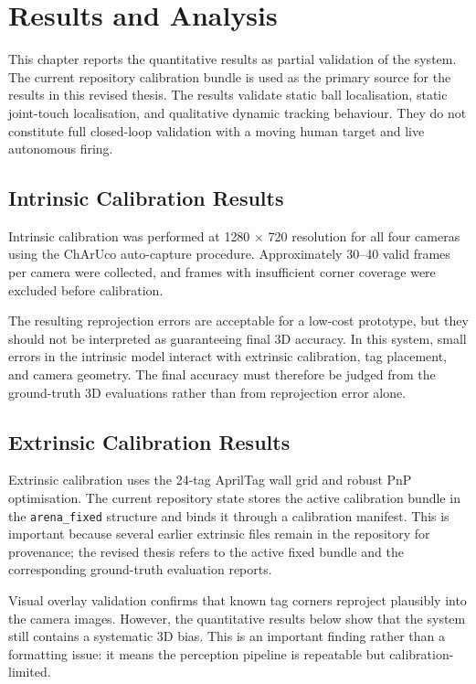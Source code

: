 \chapter{Results and Analysis}

This chapter reports the quantitative results as partial validation of the system. The current repository calibration bundle is used as the primary source for the results in this revised thesis. The results validate static ball localisation, static joint-touch localisation, and qualitative dynamic tracking behaviour. They do not constitute full closed-loop validation with a moving human target and live autonomous firing.

\section{Intrinsic Calibration Results}

Intrinsic calibration was performed at 1280 $\times$ 720 resolution for all four cameras using the ChArUco auto-capture procedure. Approximately 30--40 valid frames per camera were collected, and frames with insufficient corner coverage were excluded before calibration.

The resulting reprojection errors are acceptable for a low-cost prototype, but they should not be interpreted as guaranteeing final 3D accuracy. In this system, small errors in the intrinsic model interact with extrinsic calibration, tag placement, and camera geometry. The final accuracy must therefore be judged from the ground-truth 3D evaluations rather than from reprojection error alone.

\section{Extrinsic Calibration Results}

Extrinsic calibration uses the 24-tag AprilTag wall grid and robust PnP optimisation. The current repository state stores the active calibration bundle in the \texttt{arena\_fixed} structure and binds it through a calibration manifest. This is important because several earlier extrinsic files remain in the repository for provenance; the revised thesis refers to the active fixed bundle and the corresponding ground-truth evaluation reports.

Visual overlay validation confirms that known tag corners reproject plausibly into the camera images. However, the quantitative results below show that the system still contains a systematic 3D bias. This is an important finding rather than a formatting issue: it means the perception pipeline is repeatable but calibration-limited.

